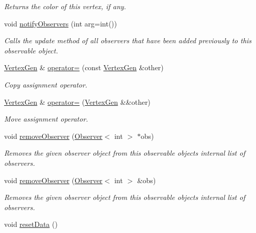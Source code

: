 \begin{DoxyCompactItemize}
\begin{DoxyCompactList}\small\item\em Returns the color of this vertex, if any. \end{DoxyCompactList}\item 
void \mbox{\hyperlink{classObservable_a337380718b992689248fac2927145c62}{notify\+Observers}} (int arg=int())
\begin{DoxyCompactList}\small\item\em Calls the update method of all observers that have been added previously to this observable object. \end{DoxyCompactList}\item 
\mbox{\hyperlink{classVertexGen}{Vertex\+Gen}} \& \mbox{\hyperlink{classVertexGen_aa22afb123ae6fddef177390c73b90fd4}{operator=}} (const \mbox{\hyperlink{classVertexGen}{Vertex\+Gen}} \&other)
\begin{DoxyCompactList}\small\item\em Copy assignment operator. \end{DoxyCompactList}\item 
\mbox{\hyperlink{classVertexGen}{Vertex\+Gen}} \& \mbox{\hyperlink{classVertexGen_afa38659fe8bf4a66b0e3f7c4d37f347f}{operator=}} (\mbox{\hyperlink{classVertexGen}{Vertex\+Gen}} \&\&other)
\begin{DoxyCompactList}\small\item\em Move assignment operator. \end{DoxyCompactList}\item 
void \mbox{\hyperlink{classObservable_a2fbb493a74c7c4a7604326bffcd75dbd}{remove\+Observer}} (\mbox{\hyperlink{classObserver}{Observer}}$<$ int $>$ $\ast$obs)
\begin{DoxyCompactList}\small\item\em Removes the given observer object from this observable object\textquotesingle{}s internal list of observers. \end{DoxyCompactList}\item 
void \mbox{\hyperlink{classObservable_a36b9c4607c1cab08dc800daa5aa38b82}{remove\+Observer}} (\mbox{\hyperlink{classObserver}{Observer}}$<$ int $>$ \&obs)
\begin{DoxyCompactList}\small\item\em Removes the given observer object from this observable object\textquotesingle{}s internal list of observers. \end{DoxyCompactList}\item 
void \mbox{\hyperlink{classVertexGen_ab51301d11ddc80165b3b7798b866421e}{reset\+Data}} ()

\end{DoxyCompactItemize}
